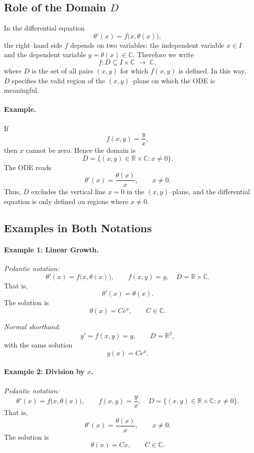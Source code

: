 \documentclass[11pt,a4paper]{article}
\begin{document}
	\subsection*{Role of the Domain $D$}
	
	In the differential equation
	$$
	\theta'(x) = f\bigl(x,\theta(x)\bigr),
	$$
	the right--hand side $f$ depends on two variables: the independent variable $x \in I$ and the dependent variable $y = \theta(x) \in \mathbb{C}$.  
	Therefore we write
	$$
	f : D \subseteq I \times \mathbb{C} \;\longrightarrow\; \mathbb{C},
	$$
	where $D$ is the set of all pairs $(x,y)$ for which $f(x,y)$ is defined.  
	In this way, $D$ specifies the valid region of the $(x,y)$--plane on which the ODE is meaningful.
	
	\paragraph{Example.}
	If
	$$
	f(x,y) = \frac{y}{x},
	$$
	then $x$ cannot be zero. Hence the domain is
	$$
	D = \{(x,y) \in \mathbb{R} \times \mathbb{C} : x \neq 0 \}.
	$$
	The ODE reads
	$$
	\theta'(x) = \frac{\theta(x)}{x}, \qquad x \neq 0.
	$$
	Thus, $D$ excludes the vertical line $x=0$ in the $(x,y)$--plane, and the differential equation is only defined on regions where $x \neq 0$.
	\subsection*{Examples in Both Notations}
	
	\paragraph{Example 1: Linear Growth.}
	
	\emph{Pedantic notation:}
	$$
	\theta'(x) = f\bigl(x,\theta(x)\bigr), \qquad 
	f(x,y) = y, \quad D = \mathbb{R} \times \mathbb{C}.
	$$
	That is,
	$$
	\theta'(x) = \theta(x).
	$$
	The solution is
	$$
	\theta(x) = C e^x, \qquad C \in \mathbb{C}.
	$$
	
	\emph{Normal shorthand:}
	$$
	y' = f(x,y) = y, \qquad D = \mathbb{R}^2,
	$$
	with the same solution
	$$
	y(x) = C e^x.
	$$
	
	\bigskip
	
	\paragraph{Example 2: Division by $x$.}
	
	\emph{Pedantic notation:}
	$$
	\theta'(x) = f\bigl(x,\theta(x)\bigr), \qquad 
	f(x,y) = \frac{y}{x}, \quad D = \{ (x,y) \in \mathbb{R} \times \mathbb{C} : x \neq 0 \}.
	$$
	That is,
	$$
	\theta'(x) = \frac{\theta(x)}{x}, \qquad x \neq 0.
	$$
	The solution is
	$$
	\theta(x) = Cx, \qquad C \in \mathbb{C}.
	$$
	
\end{document}

